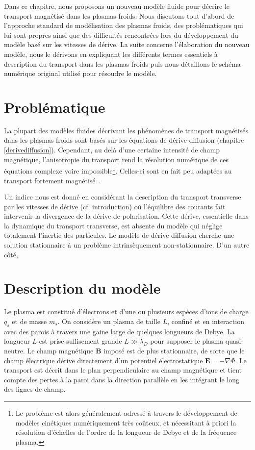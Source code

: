 \begin{refsection}


Dans ce chapitre, nous proposons un nouveau modèle fluide pour décrire le
transport magnétisé dans les plasmas froids. Nous discutons tout d'abord de
l'approche standard de modélisation des plasmas froids, des problématiques qui
lui sont propres ainsi que des difficultés rencontrées lors du développement du
modèle basé sur les vitesses de dérive. La suite concerne l'élaboration du
nouveau modèle, nous le dérivons en expliquant les différents termes essentiels
à description du transport dans les plasmas froids puis nous détaillons le
schéma numérique original utilisé pour résoudre le modèle.
\section{Problématique}
La plupart des modèles fluides décrivant les phénomènes de transport magnétisés
dans les plasmas froids sont basés sur les équations de dérive-diffusion
(chapitre \ref{derivediffusion}). Cependant, au delà d'une certaine intensité de
champ magnétique, l'anisotropie du transport rend la résolution numérique de ces
équations complexe voire impossible\footnote{Le problème est alors généralement
adressé à travers le développement de modèles cinétiques numériquement très
coûteux, et nécessitant à priori la résolution d'échelles de l'ordre de la
longueur de Debye et de la fréquence plasma.}.
Celles-ci sont en fait peu adaptées au transport fortement
magnétisé~\cite{Golant}.


Un indice nous est donné en considérant la description du transport transverse
par les vitesses de dérive (cf.
introduction) où l'équilibre des courants fait intervenir la divergence de la
dérive de polarisation. Cette dérive, essentielle dans la dynamique du transport
transverse, est absente du modèle qui néglige totalement l'inertie des
particules. Le modèle de dérive-diffusion cherche une solution stationnaire à un
problème intrinsèquement non-stationnaire.
\parencite{Fruchtman}
\parencite{Sternberg}
D'un autre côté,

\section{Description du modèle}
Le plasma est constitué d'électrons et d'une ou plusieurs espèces d'ions de
charge $q_s$ et de masse $m_s$. On considère un plasma de taille $L$, confiné et
en interaction avec des parois à travers une gaine large de quelques longueurs
de Debye. La longueur $L$ est prise suffisement grande $L\gg\lambda_D$ pour
supposer le plasma quasi-neutre. Le champ magnétique $\mathbf{B}$ imposé est de
plus stationnaire, de sorte que le champ électrique dérive directement d'un
potentiel électrostatique $\mathbf{E}=-\nabla \Phi$. Le transport est décrit
dans le plan perpendiculaire au champ magnétique et tient compte des pertes à la
paroi dans la direction parallèle en les intégrant le long des lignes de champ.


\end{refsection}
